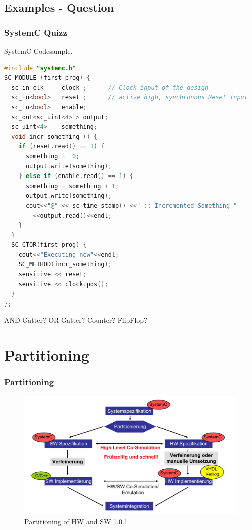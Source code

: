 \documentclass{beamer}
\begin{document}
\subsection{Examples - Question}
\begin{frame}[fragile]\frametitle{SystemC Quizz} 
SystemC Codesample.
\begin{lstlisting}[language=C++,basicstyle=\tiny]
#include "systemc.h"
SC_MODULE (first_prog) {
  sc_in_clk     clock ;      // Clock input of the design
  sc_in<bool>   reset ;      // active high, synchronous Reset input
  sc_in<bool>   enable;     
  sc_out<sc_uint<4> > output;
  sc_uint<4>	something;
  void incr_something () {
    if (reset.read() == 1) {
      something =  0;
      output.write(something);
    } else if (enable.read() == 1) {
      something = something + 1;
      output.write(something);
      cout<<"@" << sc_time_stamp() <<" :: Incremented Something "
        <<output.read()<<endl;
    }
  }
  SC_CTOR(first_prog) {
    cout<<"Executing new"<<endl;
    SC_METHOD(incr_something);
    sensitive << reset;
    sensitive << clock.pos();
  }
};
\end{lstlisting}
AND-Gatter? OR-Gatter? Counter? FlipFlop?
\end{frame}

\section{Partitioning}
\begin{frame}\frametitle{Partitioning} 
	    \begin{figure}[hp]
	      \centering
	      \includegraphics[width=1.0\textwidth]{pictures/design_flow.pdf}
	      \caption{Partitioning of HW and SW \ref{}}
	      \label{fig:flow}
	    \end{figure} 



\end{frame}
\end{document}
